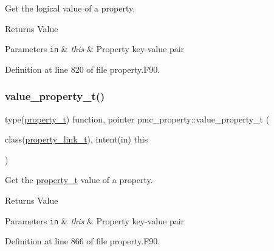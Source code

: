 Get the logical value of a property. 

\begin{DoxyReturn}{Returns}
Value
\end{DoxyReturn}

\begin{DoxyParams}[1]{Parameters}
\mbox{\tt in}  & {\em this} & Property key-\/value pair \\
\hline
\end{DoxyParams}


Definition at line 820 of file property.\+F90.

\mbox{\label{namespacepmc__property_a793853ad03f64d47abf8df8d637e53c6}} 
\subsubsection{\texorpdfstring{value\+\_\+property\+\_\+t()}{value\_property\_t()}}
{\footnotesize\ttfamily type(\mbox{\hyperlink{structpmc__property_1_1property__t}{property\+\_\+t}}) function, pointer pmc\+\_\+property\+::value\+\_\+property\+\_\+t (\begin{DoxyParamCaption}\item[{class(\mbox{\hyperlink{structpmc__property_1_1property__link__t}{property\+\_\+link\+\_\+t}}), intent(in)}]{this }\end{DoxyParamCaption})\hspace{0.3cm}{\ttfamily [private]}}



Get the \mbox{\hyperlink{structpmc__property_1_1property__t}{property\+\_\+t}} value of a property. 

\begin{DoxyReturn}{Returns}
Value
\end{DoxyReturn}

\begin{DoxyParams}[1]{Parameters}
\mbox{\tt in}  & {\em this} & Property key-\/value pair \\
\hline
\end{DoxyParams}


Definition at line 866 of file property.\+F90.

\mbox{\label{namespacepmc__property_a0ef35a2bc42efede42972be617c65e27}} 
